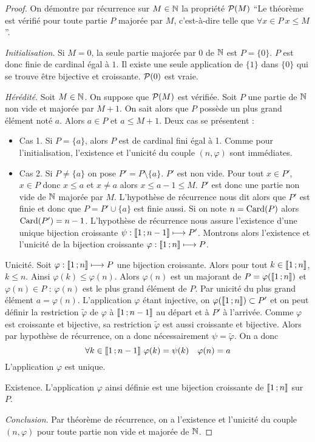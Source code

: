 \begin{proof}
  On démontre par récurrence sur \(M \in \N\) la propriété \(\P(M)\) ``Le théorème est vérifié pour toute partie \(P\) majorée par \(M\), c'est-à-dire telle que \(\forall x \in P \ x \leq M\)''.

\emph{Initialisation}. Si \(M=0\), la seule partie majorée par \(0\) de \(\N\) est \(P=\{0\}\). \(P\) est donc finie de cardinal égal à \(1\). Il existe une seule application de \(\{1\}\) dans \(\{0\}\) qui se trouve être bijective et croissante. \(\P(0)\) est vraie.

\emph{Hérédité}. Soit \(M \in \N\). On suppose que \(\P(M)\) est vérifiée. Soit \(P\) une partie de \(\N\) non vide et majorée par \(M+1\). On sait alors que \(P\) possède un plus grand élément noté \(a\). Alors \(a \in P\) et \(a \leq M+1\). Deux cas se présentent :
\begin{itemize}
\item Cas 1. Si \(P=\{a\}\), alors \(P\) est de cardinal fini égal à 1. Comme pour l'initialisation, l'existence et l'unicité du couple \((n, \varphi)\) sont immédiates.
\item Cas 2. Si \(P \neq \{a\}\) on pose \(P'=P\setminus\{a\}\). \(P'\) est non vide. Pour tout \(x \in P'\), \(x \in P\) donc \(x \leq a\) et \(x \neq a\) alors \(x \leq a-1 \leq M\). \(P'\) est donc une partie non vide de \(\N\) majorée par \(M\). L'hypothèse de récurrence nous dit alors que \(P'\) est finie et donc que \(P=P' \cup \{a\}\) est finie aussi. Si on note \(n = \Card(P)\) alors \(\Card(P')=n-1\). L'hypothèse de récurrence nous assure l'existence d'une unique bijection croissante \(\psi : \intervalleentier{1}{n-1}\longmapsto P'\). Montrons alors l'existence et l'unicité de la bijection croissante \(\varphi : \intervalleentier{1}{n} \longmapsto P\).
\end{itemize}

Unicité. Soit \(\varphi : \intervalleentier{1}{n} \longmapsto P\) une bijection croissante. Alors pour tout \(k \in \intervalleentier{1}{n}\), \(k \leq n\). Ainsi \(\varphi(k) \leq \varphi(n)\). Alors \(\varphi(n)\) est un majorant de \(P=\varphi(\intervalleentier{1}{n})\) et \(\varphi(n) \in P\) : \(\varphi(n)\) est le plus grand élément de \(P\). Par unicité du plus grand élément \(a=\varphi(n)\). L'application \(\varphi\) étant injective, on  \(\varphi(\intervalleentier{1}{n}) \subset P'\) et on peut définir la restriction \(\tilde{\varphi}\) de \(\varphi\) à \(\intervalleentier{1}{n-1}\) au départ et à \(P'\) à l'arrivée. Comme \(\varphi\) est croissante et bijective, sa restriction \(\tilde{\varphi}\) est aussi croissante et bijective. Alors par hypothèse de récurrence, on a donc nécessairement \(\psi = \tilde{\varphi}\). On a donc
\begin{equation}
  \forall k \in \intervalleentier{1}{n-1}\ \varphi(k)=\psi(k) \quad \varphi(n)=a
\end{equation}
L'application \(\varphi\) est unique.

Existence. L'application \(\varphi\) ainsi définie est une bijection croissante de \(\intervalleentier{1}{n}\) sur \(P\).

\emph{Conclusion}. Par théorème de récurrence, on a l'existence et l'unicité du couple \((n, \varphi)\) pour toute partie non vide et majorée de \(\N\).
\end{proof}
